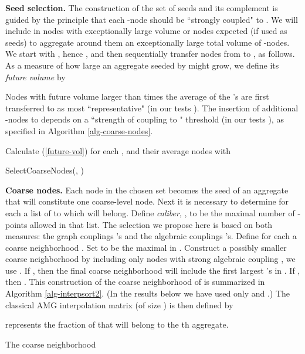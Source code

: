 \documentclass[final]{siamltex}
\begin{document}
\par {\bf Seed selection.} The construction of the set of seeds  and its complement
 is guided by the principle that each -node should be
``strongly coupled" to . We will include in  nodes with
exceptionally large volume or nodes expected (if used as seeds)
to aggregate around them an exceptionally large total volume of -nodes.
We start with , hence , and then sequentially
transfer nodes from  to , as follows. As a measure of how
large an aggregate seeded by  might grow, we define its
{\it future volume} 
by

Nodes with future volume larger than  times the
average of the 's are first transferred to  as
most ``representative" (in our tests ). The insertion of
additional -nodes to  depends on a ``strength of coupling to " threshold  (in our
tests ),
as specified in Algorithm
\ref{alg-coarse-nodes}.
\begin{algorithm}
\SetLine
\KwData{, }

\; Calculate 
(\ref{future-vol}) for each , and their average
\; nodes  with \; \;
\SetLine {} {
\SetNoline {}\; }
\caption{SelectCoarseNodes(, )}\label{alg-coarse-nodes}
\end{algorithm}
\par {\bf Coarse nodes.} Each node in the chosen set  becomes
the seed of an aggregate that will constitute one coarse-level
node. Next it is necessary to determine for each  a list
of  to which  will belong. Define {\it caliber}, ,
to be the maximal number of -points allowed in that list. The
selection we propose here is based on both measures: the graph
couplings 's and the algebraic couplings 's.
Define for each  a coarse neighborhood
. Set  to be the
maximal  in . Construct a possibly
smaller coarse neighborhood by including only nodes with strong
algebraic coupling , we use . If , then the final coarse
neighborhood  will include the first  largest
's in . If , then
. This construction of the coarse
neighborhood  of  is summarized in Algorithm
\ref{alg-interpsort2}. (In the results below we have used only  and .)
The classical AMG interpolation matrix
 (of size ) is then defined by

 represents the fraction of  that will belong to the
th aggregate.

\begin{algorithm}
\SetLine \KwData{, , } \; \; \;
\SetVline
{} \If{}{ \; } \caption{The coarse neighborhood
}\label{alg-interpsort2}
\end{algorithm}
\end{document}
